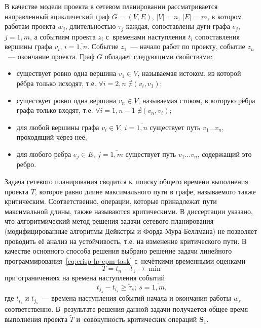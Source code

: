 В качестве модели проекта в сетевом планировании рассматривается направленный ациклический граф $G=(V,E)$, $\left| V \right|=n$, $\left| E \right|=m$, в котором работам проекта $w_j$, длительностью $\tau_j$ каждая, сопоставлены дуги графа $e_j$, $j=\overline{1,m}$, а событиям проекта $z_i$ с~временами наступления $t_i$ сопоставления вершины графа $v_i$, $i=\overline{1,n}$. Событие $z_1$~--- начало работ по проекту, событие $z_n$~--- окончание проекта. Граф $G$ обладает следующими свойствами:
\begin{itemize}
  \item существует ровно одна вершина $v_1\in V$, называемая истоком, из которой рёбра только исходят, т.е. $\forall i=2,n$ $\nexists \left( v_i, v_1 \right)$;
  \item существует ровно одна вершина $v_n\in V$, называемая стоком, в которую рёбра графа только входят, т.е.  $\forall i=\overline{1,n-1}$ $\nexists \left( v_n, v_i \right)$;
  \item для любой вершины графа $v_i\in V,\ i=\overline{1,n}$ существует путь $v_1\ldots v_n$, проходящий через неё;
  \item для любого ребра $e_j\in E,\ j=\overline{1,m}$ существует путь $v_1\ldots v_n$, содержащий это ребро.
\end{itemize}

Задача сетевого планирования сводится к~поиску общего времени выполнения проекта $T$, которое равно длине максимального пути в графе, называемого также критическим. Соответственно, операции, которые принадлежат пути максимальной длины, также называются критическими. В диссертации указано, что алгоритмический метод решения задачи сетевого планирования (модифицированные алгоритмы Дейкстры и Форда-Мура-Беллмана) не позволяет проводить её анализ на устойчивость, т.е. на изменение критического пути. В качестве основного способа решения выбрано решение задачи линейного программирования~\eqref{eq:crisp-lp-cpm-task} с~нечёткими временными оценками
\begin{equation}
\label{eq:crisp-lp-cpm-task}
  T=t_n-t_1 \to \min
\end{equation}
при ограничениях на времена наступления событий
\begin{equation}
\label{eq:crisp-lp-cpm-restrictions}
  t_{j_s}-t_{i_s}\geqslant \tilde \tau_s;\ s=\overline{1,m},
\end{equation}
где $t_{i_s}$ и $t_{j_s}$~--- времена наступления событий начала и окончания работы $w_s$ соответственно. В~результате решения данной задачи получается общее время выполнения проекта $\tilde T$ и~совокупность критических операций $\mathbf{S}_1$.


